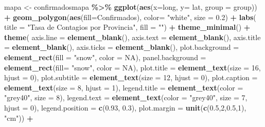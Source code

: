 \documentclass[
]{book}
\newenvironment{Shaded}{\begin{snugshade}}{\end{snugshade}}
\newcommand{\DataTypeTok}[1]{\textcolor[rgb]{0.13,0.29,0.53}{#1}}
\newcommand{\DecValTok}[1]{\textcolor[rgb]{0.00,0.00,0.81}{#1}}
\newcommand{\FloatTok}[1]{\textcolor[rgb]{0.00,0.00,0.81}{#1}}
\newcommand{\KeywordTok}[1]{\textcolor[rgb]{0.13,0.29,0.53}{\textbf{#1}}}
\newcommand{\NormalTok}[1]{#1}
\newcommand{\OperatorTok}[1]{\textcolor[rgb]{0.81,0.36,0.00}{\textbf{#1}}}
\newcommand{\OtherTok}[1]{\textcolor[rgb]{0.56,0.35,0.01}{#1}}
\newcommand{\StringTok}[1]{\textcolor[rgb]{0.31,0.60,0.02}{#1}}
\begin{document}
\begin{Shaded}
\begin{Highlighting}[]
\NormalTok{mapa \textless{}{-}}\StringTok{ }\NormalTok{confirmadosmapa }\OperatorTok{\%\textgreater{}\%}
\StringTok{  }\KeywordTok{ggplot}\NormalTok{(}\KeywordTok{aes}\NormalTok{(}\DataTypeTok{x=}\NormalTok{long, }\DataTypeTok{y=}\NormalTok{ lat, }\DataTypeTok{group =}\NormalTok{ group)) }\OperatorTok{+}
\StringTok{  }\KeywordTok{geom\_polygon}\NormalTok{(}\KeywordTok{aes}\NormalTok{(}\DataTypeTok{fill=}\NormalTok{Confirmados), }\DataTypeTok{color=} \StringTok{"white"}\NormalTok{, }\DataTypeTok{size =} \FloatTok{0.2}\NormalTok{) }\OperatorTok{+}
\StringTok{  }\KeywordTok{labs}\NormalTok{( }\DataTypeTok{title =} \StringTok{"Tasa de Contagios por Provincia"}\NormalTok{,}
        \DataTypeTok{fill =} \StringTok{""}\NormalTok{) }\OperatorTok{+}
\StringTok{  }\KeywordTok{theme\_minimal}\NormalTok{() }\OperatorTok{+}
\StringTok{  }\KeywordTok{theme}\NormalTok{(}
    \DataTypeTok{axis.line =} \KeywordTok{element\_blank}\NormalTok{(),}
    \DataTypeTok{axis.text =} \KeywordTok{element\_blank}\NormalTok{(),}
    \DataTypeTok{axis.title =} \KeywordTok{element\_blank}\NormalTok{(),}
    \DataTypeTok{axis.ticks =} \KeywordTok{element\_blank}\NormalTok{(),}
    \DataTypeTok{plot.background =} \KeywordTok{element\_rect}\NormalTok{(}\DataTypeTok{fill =} \StringTok{"snow"}\NormalTok{, }\DataTypeTok{color =} \OtherTok{NA}\NormalTok{),}
    \DataTypeTok{panel.background =} \KeywordTok{element\_rect}\NormalTok{(}\DataTypeTok{fill=} \StringTok{"snow"}\NormalTok{, }\DataTypeTok{color =} \OtherTok{NA}\NormalTok{),}
    \DataTypeTok{plot.title =} \KeywordTok{element\_text}\NormalTok{(}\DataTypeTok{size =} \DecValTok{16}\NormalTok{, }\DataTypeTok{hjust =} \DecValTok{0}\NormalTok{),}
    \DataTypeTok{plot.subtitle =} \KeywordTok{element\_text}\NormalTok{(}\DataTypeTok{size =} \DecValTok{12}\NormalTok{, }\DataTypeTok{hjust =} \DecValTok{0}\NormalTok{),}
    \DataTypeTok{plot.caption =} \KeywordTok{element\_text}\NormalTok{(}\DataTypeTok{size =} \DecValTok{8}\NormalTok{, }\DataTypeTok{hjust =} \DecValTok{1}\NormalTok{),}
    \DataTypeTok{legend.title =} \KeywordTok{element\_text}\NormalTok{(}\DataTypeTok{color =} \StringTok{"grey40"}\NormalTok{, }\DataTypeTok{size =} \DecValTok{8}\NormalTok{),}
    \DataTypeTok{legend.text =} \KeywordTok{element\_text}\NormalTok{(}\DataTypeTok{color =} \StringTok{"grey40"}\NormalTok{, }\DataTypeTok{size =} \DecValTok{7}\NormalTok{, }\DataTypeTok{hjust =} \DecValTok{0}\NormalTok{),}
    \DataTypeTok{legend.position =} \KeywordTok{c}\NormalTok{(}\FloatTok{0.93}\NormalTok{, }\FloatTok{0.3}\NormalTok{),}
    \DataTypeTok{plot.margin =} \KeywordTok{unit}\NormalTok{(}\KeywordTok{c}\NormalTok{(}\FloatTok{0.5}\NormalTok{,}\DecValTok{2}\NormalTok{,}\FloatTok{0.5}\NormalTok{,}\DecValTok{1}\NormalTok{), }\StringTok{"cm"}\NormalTok{)) }\OperatorTok{+}

\end{Highlighting}
\end{Shaded}
\end{document}
